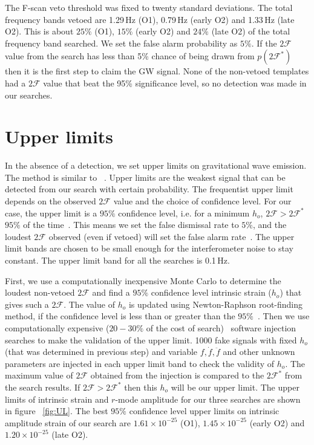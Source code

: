 \documentclass{ttuthes2007}
\begin{document}
 
The F-scan veto threshold was fixed to twenty standard
deviations. The total frequency bands vetoed are 1.29\,Hz (O1), 0.79\,Hz
(early O2) and 1.33\,Hz (late O2). This is about $25\%$ (O1), $15\%$ (early O2)
and $24\%$ (late O2) of the total frequency band searched. We set the false
alarm probability as $5\%$. If the $2\mathcal{F}$
value from the search has less than 5\% chance of being drawn from
$p(2\mathcal{F}^*)$ then it is the first step to claim the \ac{GW} signal. None
of the non-vetoed templates had a $2\mathcal{F}$ value that beat the 95\%
significance level, so no detection was made in our searches.

\section{Upper limits}
In the absence of a detection, we set upper limits on gravitational wave
emission. The method is similar to ~\citet{Lindblom_2020}. Upper limits are the
weakest signal that can be detected from our search with certain probability.
The frequentist upper limit depends on the observed $2\mathcal{F}$ value and the
choice of confidence level. For our case, the upper limit is a $95\%$ confidence
level, i.e. for a minimum $h_o$, $2\mathcal{F} > 2\mathcal{F}^*$ $95\%$ of the
time~\cite{Romano_2017}. This means we set the false dismissal rate to $5\%$,
and the loudest $2\mathcal{F}$ observed (even if vetoed) will set the false alarm
rate~\cite{Aasi_2015}. The upper limit bands are chosen to be small enough for
the interferometer noise to stay constant. The upper limit band for all the
searches is 0.1\,Hz. 

First, we use a computationally inexpensive Monte Carlo to determine the loudest
non-vetoed $2\mathcal{F}$ and find a $95\%$ confidence level intrinsic strain
($h_o$) that gives such a $2\mathcal{F}$. The value of $h_o$ is updated using
Newton-Raphson root-finding method, if the
confidence level is less than or greater than the $95\%$~\cite{ Wette:2009uea}.
Then we use computationally expensive
($20- 30\%$ of the cost of search)~\cite{Aasi_2015} software injection searches
to make the validation of the upper limit. 1000 fake signals with fixed $h_o$
(that was determined in previous step) and variable $f,\dot{f},\ddot{f}$ and
other unknown parameters are injected in each upper limit band to check the
validity of $h_o$. The maximum value of $2\mathcal{F}$ obtained from the
injection is compared to the $2\mathcal{F}^*$ from the search results. If
$2\mathcal{F}> 2\mathcal{F}^*$ then this $h_o$ will be our upper limit.  The
upper limits of intrinsic strain and $r$-mode amplitude for our three searches
are
shown in figure ~\ref{fig:UL}.  The best $95\%$ confidence level upper limits on
intrinsic amplitude strain of our search are $1.61\times 10^{-25}$ (O1),
$1.45\times 10^{-25}$ (early O2) and $1.20\times 10^{-25}$ (late O2).
\end{document}
